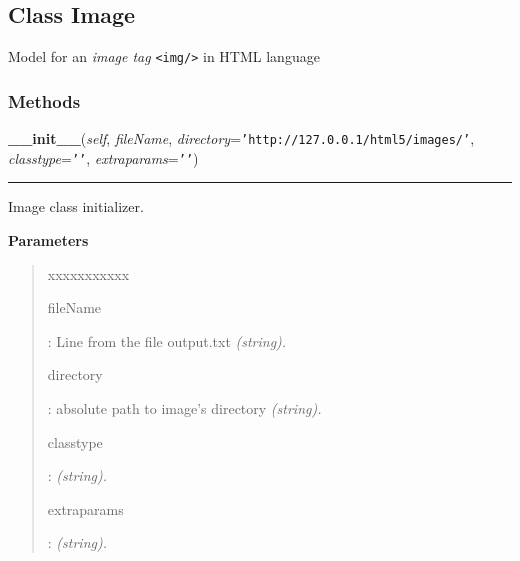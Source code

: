 \subsection{Class Image}

    \label{module_Web:Image}

Model for an \emph{image tag} \texttt{<img/>} in HTML language


  \subsubsection{Methods}

    \label{module_Web:Image:__init__}

    \vspace{0.5ex}

\hspace{.8\funcindent}\begin{boxedminipage}{\funcwidth}

    \raggedright \textbf{\_\_init\_\_}(\textit{self}, \textit{fileName}, \textit{directory}={\tt \texttt{'}\texttt{http://127.0.0.1/html5/images/}\texttt{'}}, \textit{classtype}={\tt \texttt{'}\texttt{}\texttt{'}}, \textit{extraparams}={\tt \texttt{'}\texttt{}\texttt{'}})

    \vspace{-1.5ex}

    \rule{\textwidth}{0.5\fboxrule}
\setlength{\parskip}{2ex}

Image class initializer.
%
\begin{quote}

\end{quote}
\setlength{\parskip}{1ex}
      \textbf{Parameters}
      \vspace{-1ex}

      \begin{quote}
        \begin{Ventry}{xxxxxxxxxxx}

          \item[fileName]


:   Line from the file output.txt \emph{(string).}
          \item[directory]


:  absolute path to image's directory \emph{(string).}
          \item[classtype]


:  \emph{(string).}
          \item[extraparams]


:        \emph{(string).}
        \end{Ventry}

      \end{quote}

    \end{boxedminipage}


